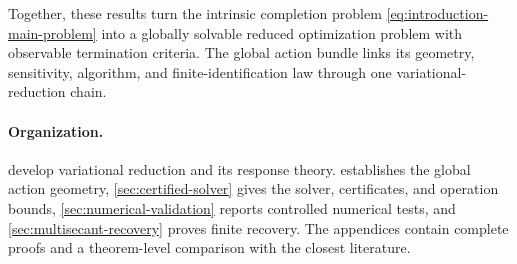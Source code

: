 Together, these results turn the intrinsic completion problem
\eqref{eq:introduction-main-problem} into a globally solvable reduced
optimization problem with observable termination criteria.  The global action
bundle links its geometry, sensitivity, algorithm, and finite-identification
law through one variational-reduction chain.

\paragraph{Organization.}
 develop variational reduction and its
response theory.   establishes the global action
geometry, \cref{sec:certified-solver} gives the solver, certificates, and operation
bounds, \cref{sec:numerical-validation} reports controlled numerical tests,
and \cref{sec:multisecant-recovery} proves finite recovery.  The appendices
contain complete proofs and a theorem-level comparison with the closest
literature.
